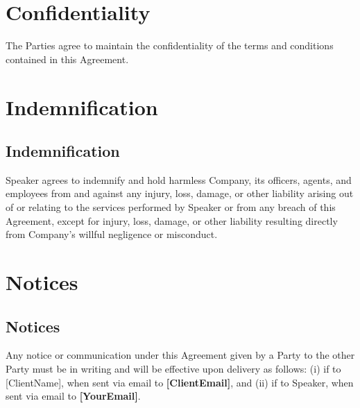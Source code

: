 \documentclass[a4paper,12pt]{article} %
\newcommand{\YourEmail}{[YourEmail]}
\newcommand{\ClientName}{[ClientName]}
\newcommand{\ClientEmail}{[ClientEmail]}
\begin{document}

\section{Confidentiality}

The Parties agree to maintain the confidentiality of the terms and conditions contained in this Agreement.


\section{Indemnification}

\subsection{Indemnification}

Speaker agrees to indemnify and hold harmless Company, its officers, agents, and employees from and against any injury, loss, damage, or other liability arising out of or relating to the services performed by Speaker or from any breach of this Agreement, except for injury, loss, damage, or other liability resulting directly from Company's willful negligence or misconduct.


\section{Notices}

\subsection{Notices}

Any notice or communication under this Agreement given by a Party to the other Party must be in writing and will be effective upon delivery as follows: (i) if to \ClientName, when sent via email to \textbf{\ClientEmail}, and (ii) if to Speaker, when sent via email to \textbf{\YourEmail}.
\end{document}
